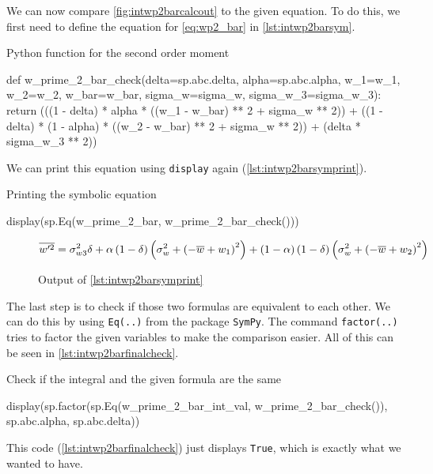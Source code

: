 We can now compare \cref{fig:intwp2barcalcout} to the given equation.
To do this, we first need to define the equation for \cref{eq:wp2_bar} in \cref{lst:intwp2barsym}.
\begin{listing}[!ht]
    \caption{Python function for the second order moment}
    \label{lst:intwp2barsym}
    \begin{pythoncode}
        def w_prime_2_bar_check(delta=sp.abc.delta, alpha=sp.abc.alpha, w_1=w_1, w_2=w_2, w_bar=w_bar, sigma_w=sigma_w, sigma_w_3=sigma_w_3):
            return (((1 - delta) * alpha * ((w_1 - w_bar) ** 2 + sigma_w ** 2))
                + ((1 - delta) * (1 - alpha) * ((w_2 - w_bar) ** 2 + sigma_w ** 2))
                + (delta * sigma_w_3 ** 2))
    \end{pythoncode}
\end{listing}
We can print this equation using \texttt{display} again (\cref{lst:intwp2barsymprint}).
\begin{listing}[!ht]
    \caption{Printing the symbolic equation}
    \label{lst:intwp2barsymprint}
    \begin{pythoncode}
        display(sp.Eq(w_prime_2_bar, w_prime_2_bar_check()))
    \end{pythoncode}
\end{listing}
\begin{figure}[!ht]
    \centering
    \caption{Output of \cref{lst:intwp2barsymprint}}
    \label{fig:intwp2barsymprintout}
    \begin{align}
        \nonumber
        \overline{w'^2}
        = \sigma_{w3}^{2} \delta + \alpha \left(1 - \delta\right)
        \left(\sigma_{w}^{2} + \left(- \overline{w} + w_{1}\right)^{2}\right) +
        \left(1 -\alpha\right) \left(1 - \delta\right) \left(\sigma_{w}^{2} +
        \left(- \overline{w} + w_{2}\right)^{2}\right)
    \end{align}
\end{figure}
The last step is to check if those two formulas are equivalent to each other.
We can do this by using \texttt{Eq(..)} from the package \texttt{SymPy}.
The command \texttt{factor(..)} tries to factor the given variables to make the comparison easier.
All of this can be seen in \cref{lst:intwp2barfinalcheck}.
\begin{listing}[!ht]
    \caption{Check if the integral and the given formula are the same}
    \label{lst:intwp2barfinalcheck}
    \begin{pythoncode}
        display(sp.factor(sp.Eq(w_prime_2_bar_int_val, w_prime_2_bar_check()), sp.abc.alpha, sp.abc.delta))
    \end{pythoncode}
\end{listing}
This code (\cref{lst:intwp2barfinalcheck}) just displays \texttt{True},
which is exactly what we wanted to have.

